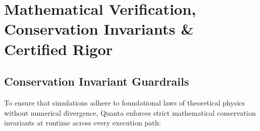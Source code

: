 \documentclass[aps,prx,twocolumn,superscriptaddress,nofootinbib]{revtex4-2}
\begin{document}
\section{Mathematical Verification, Conservation Invariants \& Certified Rigor}
\label{sec:math_rigor}

\subsection{Conservation Invariant Guardrails}
\label{subsec:guardrails}

To ensure that simulations adhere to foundational laws of theoretical physics without numerical divergence, Quanta enforces strict mathematical conservation invariants at runtime across every execution path:
\end{document}
